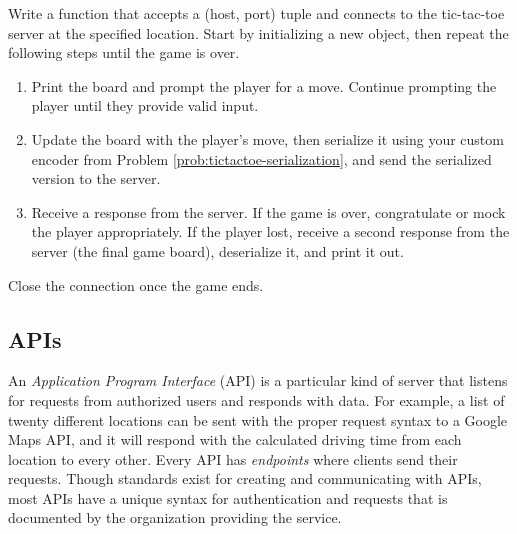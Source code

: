 \begin{problem}
Write a function that accepts a (host, port) tuple and connects to the tic-tac-toe server at the specified location.
Start by initializing a new  object, then repeat the following steps until the game is over.
\begin{enumerate}
\item Print the board and prompt the player for a move.
Continue prompting the player until they provide valid input.
\item Update the board with the player's move, then serialize it using your custom encoder from Problem \ref{prob:tictactoe-serialization}, and send the serialized version to the server.
\item Receive a response from the server.
If the game is over, congratulate or mock the player appropriately.
If the player lost, receive a second response from the server (the final game board), deserialize it, and print it out.
\end{enumerate}
Close the connection once the game ends.
\label{prob:tictactoe-client}
\end{problem}

\subsection*{APIs}

An \emph{Application Program Interface} (API) is a particular kind of server that listens for requests from authorized users and responds with data.
For example, a list of twenty different locations can be sent with the proper request syntax to a Google Maps API, and it will respond with the calculated driving time from each location to every other.
Every API has \emph{endpoints} where clients send their requests.
Though standards exist for creating and communicating with APIs, most APIs have a unique syntax for authentication and requests that is documented by the organization providing the service.



